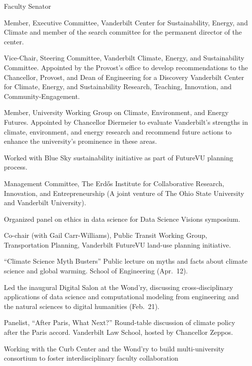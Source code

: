 \item[2025--2028] Faculty Senator
\item[2024--present] Member, Executive Committee,
  Vanderbilt Center for Sustainability, Energy, and Climate
  and member of the search committee for the permanent director of the center.
\item[2023--2024] Vice-Chair, Steering Committee, Vanderbilt Climate, Energy, and Sustainability
  Committee. Appointed by the Provost's office to develop recommendations to the Chancellor, Provost, and Dean of Engineering for a Discovery Vanderbilt Center for
  Climate, Energy, and Sustainability Research, Teaching, Innovation, and
  Community-Engagement.
\item[2021--2022] Member, University Working Group on Climate, Environment,
  and Energy Futures.
  Appointed by Chancellor Diermeier to evaluate Vanderbilt's strengths in climate,
  environment, and energy research and recommend future actions to enhance
  the university's prominence in these areas.
\item[2018--2019] Worked with Blue Sky sustainability initiative as part of
  FutureVU planning process.
\item[2017--2019] Management Committee, The Erd\H{o}s Institute for
  Collaborative Research, Innovation, and Entrepreneurship (A joint venture of
  The Ohio State University and Vanderbilt University).
\item[2018] Organized panel on ethics in data science for Data Science Visions
symposium.
\item[2017] Co-chair (with Gail Carr-Williams), Public Transit Working Group,
  Transportation Planning, Vanderbilt FutureVU land-use planning initiative.
\item[2017] ``Climate Science Myth Busters'' Public lecture on myths and facts
  about climate science and global warming. School of Engineering (Apr.~12).
\item[2017] Led the inaugural Digital Salon at the Wond'ry, discussing
  cross-disciplinary applications of data science and computational modeling
  from engineering and the natural sciences to digital humanities (Feb.~21).
\item[2016] Panelist, ``After Paris, What Next?''  Round-table discussion of
  climate policy after the Paris accord. Vanderbilt Law School, hosted by
  Chancellor Zeppos.
\item[2015--2017] Working with the Curb Center and the Wond'ry to build
  multi-university consortium to foster interdisciplinary faculty collaboration
